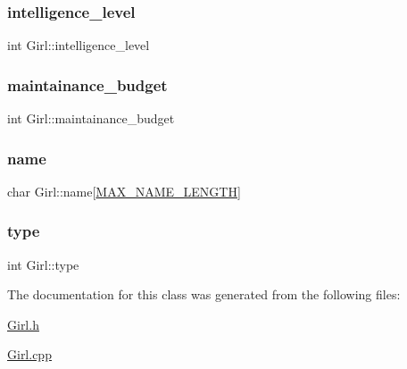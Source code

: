 \mbox{\label{class_girl_a5c6c20728355a49c2776f291b95e8253}} 
\subsubsection{\texorpdfstring{intelligence\+\_\+level}{intelligence\_level}}
{\footnotesize\ttfamily int Girl\+::intelligence\+\_\+level}

\mbox{\label{class_girl_a26a1e9bb93af4617482020c94fa7228c}} 
\subsubsection{\texorpdfstring{maintainance\+\_\+budget}{maintainance\_budget}}
{\footnotesize\ttfamily int Girl\+::maintainance\+\_\+budget}

\mbox{\label{class_girl_a2004677d7018a6564637f77e943e18ed}} 
\subsubsection{\texorpdfstring{name}{name}}
{\footnotesize\ttfamily char Girl\+::name\mbox{[}\hyperlink{_girl_8h_a0c397a708cec89c74029582574516b30}{M\+A\+X\+\_\+\+N\+A\+M\+E\+\_\+\+L\+E\+N\+G\+TH}\mbox{]}}

\mbox{\label{class_girl_ac0242bb0ae7c23f69a75537437f76586}} 
\subsubsection{\texorpdfstring{type}{type}}
{\footnotesize\ttfamily int Girl\+::type}



The documentation for this class was generated from the following files\+:\begin{DoxyCompactItemize}
\item 
\hyperlink{_girl_8h}{Girl.\+h}\item 
\hyperlink{_girl_8cpp}{Girl.\+cpp}\end{DoxyCompactItemize}
